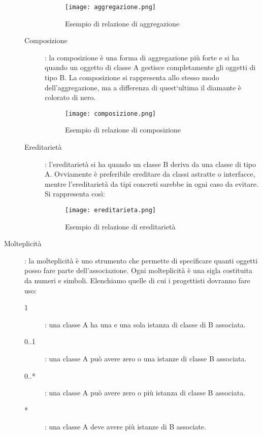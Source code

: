 \documentclass[../../norme-di-progetto.tex]{subfiles}
\begin{document}
\begin{description}
\begin{description}
\begin{figure}[H]
                  \label{fig:aggregazione}
                  \texttt{[image: aggregazione.png]}
                  \centering
                  \caption{Esempio di relazione di aggregazione}
                \end{figure}
          \item [Composizione]: la composizione è una forma di aggregazione più forte e si ha quando un oggetto di classe A gestisce completamente gli oggetti di tipo B.
                La composizione si rappresenta allo stesso modo dell'aggregazione, ma a differenza di quest`ultima il diamante è colorato di nero.
                \begin{figure}[H]%
                  \label{fig:composizione}
                  \texttt{[image: composizione.png]}
                  \centering
                  \caption{Esempio di relazione di composizione}
                \end{figure}
          \item [Ereditarietà]: l'ereditarietà si ha quando un classe B deriva da una classe di tipo A.
                Ovviamente è preferibile ereditare da classi astratte o interfacce, mentre l'ereditarietà da tipi concreti sarebbe in ogni caso da evitare. Si rappresenta così:
                \begin{figure}[H]%
                  \label{fig:ereditarieta}
                  \texttt{[image: ereditarieta.png]}
                  \centering
                  \caption{Esempio di relazione di ereditarietà}
                \end{figure}
        \end{description}
  \item [Molteplicità]: la molteplicità è uno strumento che permette di specificare quanti oggetti posso fare parte dell'associazione.
        Ogni molteplicità è una sigla costituita da numeri e simboli.
        Elenchiamo quelle di cui i progettisti dovranno fare uso:
        \begin{description}
          \item [1]: una classe A ha una e una sola istanza di classe di B associata.
          \item [0..1]: una classe A può avere zero o una istanze di classe B associata.
          \item [0..*]: una classe A può avere zero o più istanza di classe B associata.
          \item [*]: una classe A deve avere più istanze di B associate.
        \end{description}
\end{description}
\end{document}
